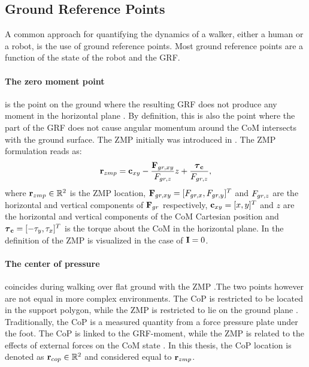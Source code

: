 \subsection{Ground Reference Points}\label{sec:grp}
A common approach for quantifying the dynamics of a walker, either a human or a robot, is the use of ground reference points. Most ground reference points are a function of the state of the robot and the \ac{GRF}.

\paragraph{The zero moment point} is the point on the ground where the resulting \ac{GRF} does not produce any moment in the horizontal plane \cite{sardain2004forces}. By definition, this is also the point where the part of the \ac{GRF} does not cause angular momentum around the \ac{CoM} intersects with the ground surface. The \ac{ZMP} initially was introduced in \cite{vukobratovic1969contribution}. The \ac{ZMP} formulation reads as:
\begin{equation}
    \mathbf{r}_{zmp}=\mathbf{c}_{xy}-\frac{\mathbf{F}_{gr,xy}}{F_{gr,z}}z+\frac{\boldsymbol{\tau}_{\mathbf{c}}}{F_{gr,z}},
\end{equation}
where $\mathbf{r}_{zmp} \in \mathbb{R}^2$ is the \ac{ZMP} location, $\mathbf{F}_{gr,xy}=[F_{gr,x},F_{gr,y}]^T$ and $F_{gr,z}$ are the horizontal and vertical components of $\mathbf{F}_{gr}$ respectively, $\mathbf{c}_{xy} = [x,y]^T$ and $z$ are the horizontal and vertical components of the \ac{CoM} Cartesian position and $\boldsymbol{\tau}_{\mathbf{c}} = [-\tau_y,\tau_x]^T$ is the torque about the \ac{CoM} in the horizontal plane. In  the definition of the \ac{ZMP} is visualized in the case of $\mathbf{I}=0$. 

\paragraph{The center of pressure} coincides during walking over flat ground with the \ac{ZMP} \cite{vukobratovic2004zero}.The two points however are not equal in more complex environments. The \ac{CoP} is restricted to be located in the support polygon, while the \ac{ZMP} is restricted to lie on the ground plane  \cite{sardain2004forces}. Traditionally, the \ac{CoP} is a measured quantity from a force pressure plate under the foot. The \ac{CoP} is linked to the \ac{GRF}-moment, while the \ac{ZMP} is related to the effects of external forces on the \ac{CoM} state \cite{sardain2004forces}. In this thesis, the \ac{CoP} location is denoted as $\mathbf{r}_{cop} \in \mathbb{R}^2$ and considered equal to $\mathbf{r}_{zmp}$.

